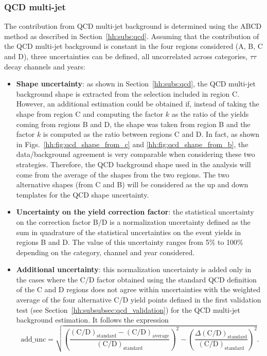 \documentclass[../main.tex]{subfiles}
\begin{document}
\subsubsection*{QCD multi-jet}

The contribution from QCD multi-jet background is determined using the ABCD method as described in Section~\ref{hh:subs:qcd}. Assuming that the contribution of the QCD multi-jet background is constant in the four regions considered (A, B, C and D), three uncertainties can be defined, all uncorrelated across categories, $\tau\tau$ decay channels and years:
\begin{itemize}
\item \textbf{Shape uncertainty}: as shown in Section~\ref{hh:subs:qcd}, the QCD multi-jet background shape is extracted from the selection included in region C. However, an additional estimation could be obtained if, instead of taking the shape from region C and computing the factor $k$ as the ratio of the yields coming from regions B and D, the shape was taken from region B and the factor $k$ is computed as the ratio between regions C and D. In fact, as shown in Figs.~\ref{hh:fig:qcd_shape_from_c} and \ref{hh:fig:qcd_shape_from_b}, the data/background agreement is very comparable when considering these two strategies. Therefore, the QCD background shape used in the analysis will come from the average of the shapes from the two regions. The two alternative shapes (from C and B) will be considered as the up and down templates for the QCD shape uncertainty.
\item \textbf{Uncertainty on the yield correction factor}: the statistical uncertainty on the correction factor B/D is a normalization uncertainty defined as the sum in quadrature of the statistical uncertainties on the event yields in regions B and D. The value of this uncertainty ranges from 5\% to 100\% depending on the category, channel and year considered.
\item \textbf{Additional uncertainty}: this normalization uncertainty is added only in the cases where the C/D factor obtained using the standard QCD definition of the C and D regions does not agree within uncertainties with the weighted average of the four alternative C/D yield points defined in the first validation test (see Section~\ref{hh:subsubsec:qcd_validation}) for the QCD multi-jet background estimation. It follows the expression
\begin{equation}
\text{add\_unc} = \sqrt{\left(\frac{(\text{C/D})_{\text{standard}} - (\text{C/D})_{\text{average}}}{(\text{C/D})_{\text{standard}}} \right)^2 - \left(\frac{\Delta(\text{C/D})_{\text{standard}}}{(\text{C/D})_{\text{standard}}} \right)^2}.
\end{equation}
\end{itemize}
\end{document}
